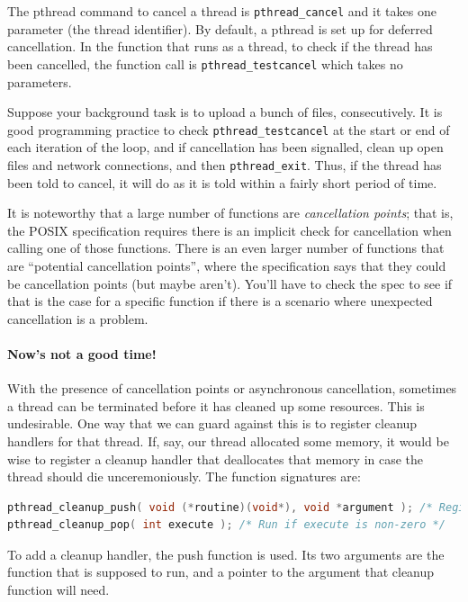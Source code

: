 \documentclass[a4paper]{report}
\begin{document}
The pthread command to cancel a thread is \texttt{pthread\_cancel} and it takes one parameter (the thread identifier). By default, a pthread is set up for deferred cancellation. In the function that runs as a thread, to check if the thread has been cancelled, the function call is \texttt{pthread\_testcancel} which takes no parameters.

Suppose your background task is to upload a bunch of files, consecutively. It is good programming practice to check \texttt{pthread\_testcancel} at the start or end of each iteration of the loop, and if cancellation has been signalled, clean up open files and network connections, and then \texttt{pthread\_exit}. Thus, if the thread has been told to cancel, it will do as it is told within a fairly short period of time.

It is noteworthy that a large number of functions are \textit{cancellation points}; that is, the POSIX specification requires there is an implicit check for cancellation when calling one of those functions. There is an even larger number of functions that are ``potential cancellation points'', where the specification says that they could be cancellation points (but maybe aren't). You'll have to check the spec to see if that is the case for a specific function if there is a scenario where unexpected cancellation is a problem.

\paragraph{Now's not a good time!} With the presence of cancellation points or asynchronous cancellation, sometimes a thread can be terminated before it has cleaned up some resources. This is undesirable. One way that we can guard against this is to register cleanup handlers for that thread. If, say, our thread allocated some memory, it would be wise to register a cleanup handler that deallocates that memory in case the thread should die unceremoniously. The function signatures are:

\begin{lstlisting}[language=C]
pthread_cleanup_push( void (*routine)(void*), void *argument ); /* Register cleanup handler, with argument */ 
pthread_cleanup_pop( int execute ); /* Run if execute is non-zero */ 
\end{lstlisting}

To add a cleanup handler, the push function is used. Its two arguments are the function that is supposed to run, and a pointer to the argument that cleanup function will need.
\end{document}
